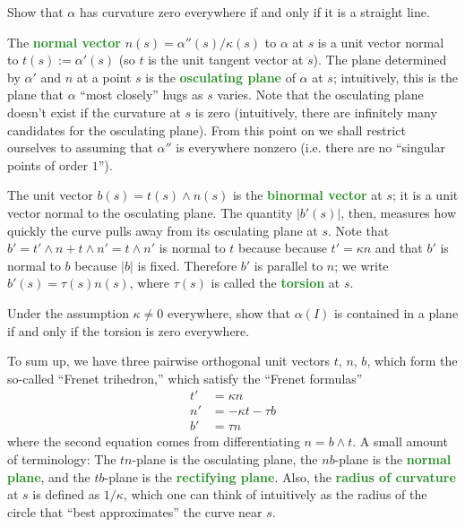 \documentclass[10pt]{scrartcl}
\providecommand{\vocab}[1]{{\textbf{\textcolor{ForestGreen}{#1}}}}
\begin{document}
\begin{exercise}
	Show that $\alpha$ has curvature zero everywhere
	if and only if it is a straight line.
\end{exercise}

The \vocab{normal vector} $n(s) = \alpha''(s)/\kappa(s)$ to $\alpha$
at $s$ is a unit vector normal to $t(s) := \alpha'(s)$
(so $t$ is the unit tangent vector at $s$).
The plane determined by $\alpha'$ and $n$ at a point $s$
is the \vocab{osculating plane} of $\alpha$ at $s$;
intuitively, this is the plane that $\alpha$ ``most closely'' hugs
as $s$ varies.
Note that the osculating plane doesn't exist if the curvature at $s$ is zero
(intuitively, there are infinitely many candidates for the osculating plane).
From this point on we shall restrict ourselves to assuming that
$\alpha''$ is everywhere nonzero (i.e. there are no
``singular points of order $1$'').

The unit vector $b(s) = t(s)\wedge n(s)$ is the \vocab{binormal vector}
at $s$; it is a unit vector normal to the osculating plane.
The quantity $|b'(s)|$, then, measures how quickly
the curve pulls away from its osculating plane at $s$.
Note that $b' = t'\wedge n + t\wedge n' = t\wedge n'$ is normal to $t$ because
because $t' = \kappa n$ and that $b'$ is normal to $b$ because $|b|$ is fixed.
Therefore $b'$ is parallel to $n$; we write $b'(s) = \tau(s)n(s)$,
where $\tau(s)$ is called the \vocab{torsion} at $s$.

\begin{exercise}
	Under the assumption $\kappa\ne 0$ everywhere, show that
	$\alpha(I)$ is contained in a plane if and only if the torsion
	is zero everywhere.
\end{exercise}

To sum up, we have three pairwise orthogonal unit vectors $t$, $n$, $b$,
which form the so-called ``Frenet trihedron,'' which
satisfy the ``Frenet formulas''
\begin{align*}
	t' &= \kappa n\\
	n' &= -\kappa t-\tau b\\
	b' &= \tau n
\end{align*}
where the second equation comes from differentiating $n=b\wedge t$.
A small amount of terminology:
The $tn$-plane is the osculating plane,
the $nb$-plane is the \vocab{normal plane}, and
the $tb$-plane is the \vocab{rectifying plane}.
Also, the \vocab{radius of curvature} at $s$ is defined as $1/\kappa$,
which one can think of intuitively as
the radius of the circle that ``best approximates'' the curve near $s$.
\end{document}
